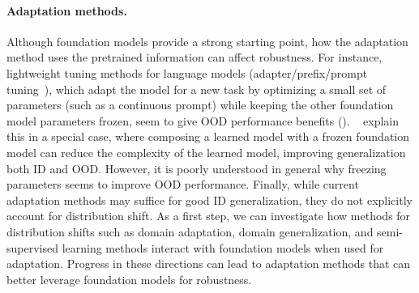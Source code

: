 \paragraph{Adaptation methods.}
Although foundation models provide a strong starting point, how the adaptation method uses the pretrained information can affect robustness.
For instance, lightweight tuning methods for language models (\eg adapter/prefix/prompt tuning~\citep{houlsby19adapter,li2021prefix,lester2021power}), which adapt the model for a new task by optimizing a small set of parameters (such as a continuous prompt) while keeping the other foundation model parameters frozen, seem to give OOD performance benefits ().
~\citet{xie2021composed} explain this in a special case, where composing a learned model with a frozen foundation model can reduce the complexity of the learned model, improving generalization both ID and OOD. However, it is poorly understood in general why freezing parameters seems to improve OOD performance.
Finally, while current adaptation methods may suffice for good ID generalization, they do not explicitly account for distribution shift. As a first step, we can investigate how methods for distribution shifts such as domain adaptation, domain generalization, and semi-supervised learning methods interact with foundation models when used for adaptation. Progress in these directions can lead to adaptation methods that can better leverage foundation models for robustness.